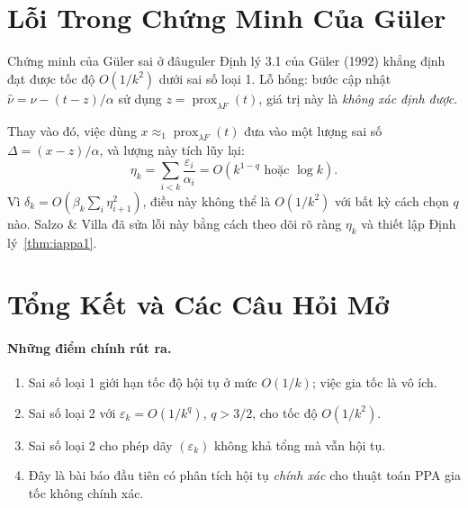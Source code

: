\documentclass[12pt, a4paper]{article}
\newcommand{\prox}{\operatorname{prox}}
\begin{document}
\section{Lỗi Trong Chứng Minh Của G\"{u}ler}

\begin{remark}{Chứng minh của G\"{u}ler sai ở đâu}{guler}
Định lý 3.1 của G\"{u}ler (1992) khẳng định đạt được tốc độ $O(1/k^2)$ dưới sai số loại 1.
Lỗ hổng: bước cập nhật
$\hat\nu=\nu-(t-z)/\alpha$
sử dụng $z=\prox_{\lambda F}(t)$, giá trị này là \emph{không xác định được}.

Thay vào đó, việc dùng $x\approx_1\prox_{\lambda F}(t)$ đưa vào một lượng sai số
$\Delta=(x-z)/\alpha$, và lượng này tích lũy lại:
\[
  \eta_k=\sum_{i<k}\frac{\varepsilon_i}{\alpha_i}=O(k^{1-q}\text{ hoặc }\log k).
\]
Vì $\delta_k=O(\beta_k\sum_i\eta_{i+1}^2)$, điều này không thể là $O(1/k^2)$
với bất kỳ cách chọn $q$ nào. Salzo \& Villa đã sửa lỗi này bằng cách theo dõi rõ ràng
$\eta_k$ và thiết lập Định lý~\ref{thm:iappa1}.
\end{remark}

\section{Tổng Kết và Các Câu Hỏi Mở}

\paragraph{Những điểm chính rút ra.}
\begin{enumerate}[label=\textbf{T\arabic*.}, leftmargin=2.5em]
  \item Sai số loại 1 giới hạn tốc độ hội tụ ở mức $O(1/k)$; việc gia tốc là vô ích.
  \item Sai số loại 2 với $\varepsilon_k=O(1/k^q)$, $q>3/2$, cho tốc độ $O(1/k^2)$.
  \item Sai số loại 2 cho phép dãy $(\varepsilon_k)$ không khả tổng mà vẫn hội tụ.
  \item Đây là bài báo đầu tiên có phân tích hội tụ \emph{chính xác} cho thuật toán PPA gia tốc không chính xác.
\end{enumerate}
\end{document}
